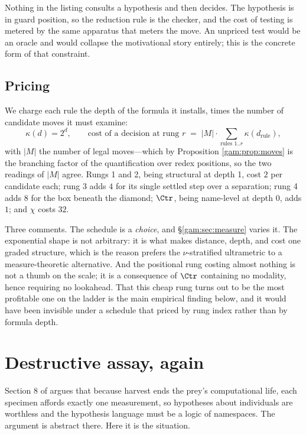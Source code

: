 \begin{remark}\label{gam:where-checker}
Nothing in the listing consults a hypothesis and then decides. The hypothesis is
in guard position, so the reduction rule is the checker, and the cost of testing
is metered by the same apparatus that meters the move. An unpriced test would be
an oracle and would collapse the motivational story entirely; this is the
concrete form of that constraint.
\end{remark}

\subsection{Pricing}\label{gam:sec:price}\label{gam:S6.1}

We charge each rule the depth of the formula it installs, times the number of
candidate moves it must examine:
\[
\kappa(d) = 2^{d}, \qquad
\text{cost of a decision at rung } r \;=\; |M| \cdot \!\!\sum_{\text{rules } 1..r}\!\! \kappa(d_{\text{rule}}) ,
\]
with $|M|$ the number of legal moves---which by Proposition \ref{gam:prop:moves} is
the branching factor of the quantification over redex positions, so the two
readings of $|M|$ agree. Rungs 1 and 2, being structural at depth 1, cost $2$
per candidate each; rung 3 adds $4$ for its single settled step over a
separation; rung 4 adds $8$ for the box beneath the diamond; $\Ctr$, being
name-level at depth 0, adds $1$; and $\chi$ costs $32$.

Three comments. The schedule is a \emph{choice}, and \S\ref{gam:sec:measure} varies
it. The exponential shape is not arbitrary: it is what makes distance, depth,
and cost one graded structure, which is the reason \chSci prefers the
$\nu$-stratified ultrametric to a measure-theoretic alternative. And the
positional rung costing almost nothing is not a thumb on the scale; it is a
consequence of $\Ctr$ containing no modality, hence requiring no lookahead. That
this cheap rung turns out to be the most profitable one on the ladder is the
main empirical finding below, and it would have been invisible under a schedule
that priced by rung index rather than by formula depth.

\section{Destructive assay, again}\label{gam:sec:destructive}\label{gam:S7}

Section 8 of \chSci argues that because harvest ends the prey's
computational life, each specimen affords exactly one measurement, so hypotheses
about individuals are worthless and the hypothesis language must be a logic of
namespaces. The argument is abstract there. Here it is the situation.

